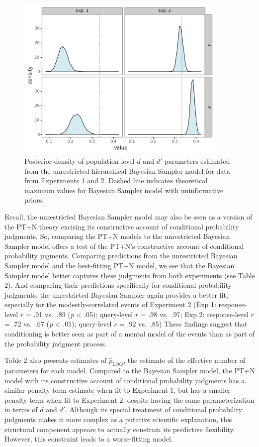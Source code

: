 \documentclass[
  english,
  man,floatsintext]{apa6}
\begin{document}
\begin{figure}[ht]
\centering
\includegraphics[width=4in]{plot_params.png}
\caption{Posterior density of population-level $d$  and $d'$ parameters estimated from the unrestricted hierarchical Bayesian Sampler model for data from Experiments 1 and 2. Dashed line indicates theoretical maximum values for Bayesian Sampler model with uninformative priors.}
\end{figure}

Recall, the unrestricted Bayesian Sampler model may also be seen as a version of the PT+N theory excising its constructive account of conditional probability judgments. So, comparing the PT+N models to the unrestricted Bayesian Sampler model offers a test of the PT+N's constructive account of conditional probability jugments. Comparing predictions from the unrestricted Bayesian Sampler model and the best-fitting PT+N model, we see that the Bayesian Sampler model better captures these judgments from both experiments (see Table 2). And comparing their predictions specifically for conditional probability judgments, the unrestricted Bayesian Sampler again provides a better fit, especially for the modestly-correlated events of Experiment 2 (Exp 1: response-level \(r\) = .91 vs.~.89 (\emph{p} \textless{} .05); query-level \(r\) = .98 vs.~.97; Exp 2: response-level \(r\) = .72 vs.~.67 (\emph{p} \textless{} .01); query-level \(r\) = .92 vs.~.85) These findings suggest that conditioning is better seen as part of a mental model of the events than as part of the probability judgment process.

Table 2 also presents estimates of \(\hat{p}_{\text{LOO}}\), the estimate of the effective number of parameters for each model. Compared to the Bayesian Sampler model, the PT+N model with its constructive account of conditional probability judgments has a similar penalty term estimate when fit to Experiment 1, but has a smaller penalty term when fit to Experiment 2, despite having the same parameterization in terms of \(d\) and \(d'\). Although its special treatment of conditional probability judgments makes it more complex as a putative scientific explanation, this structural component appears to actually constrain its predictive flexibility. However, this constraint leads to a worse-fitting model.
\end{document}
